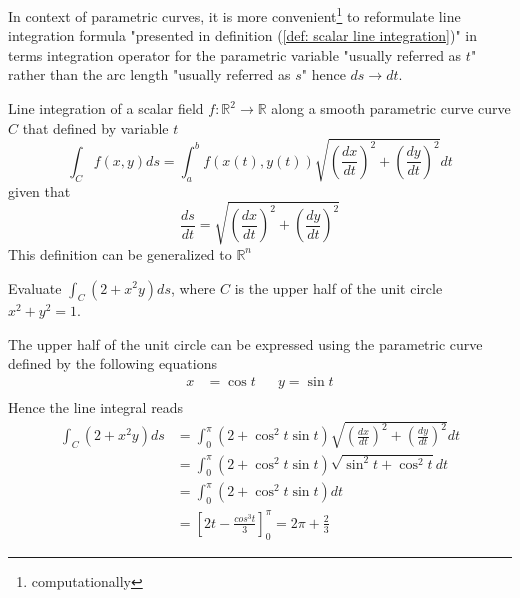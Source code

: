 \documentclass[../../main.tex]{subfiles}
\begin{document}
	\par In context of parametric curves, it is more convenient\footnote{computationally} to reformulate line integration formula  "presented in definition (\ref{def: scalar line integration})" in terms integration operator for the parametric variable "usually referred as $t$" rather than the arc length "usually referred as $s$" hence $ds \rightarrow dt$.
	
	\begin{definition}
		Line integration of a scalar field $f: \mathbb{R}^2 \rightarrow \mathbb{R}$ along a smooth parametric curve curve $C$ that defined by variable $t$
		\begin{equation*}
			\int_C f(x,y) ds = \int_a^b f(x(t), y(t)) \sqrt{\left( \frac{dx}{dt} \right)^2 + \left( \frac{dy}{dt} \right)^2} dt
		\end{equation*}
		given that
		\begin{equation*}
			\frac{ds}{dt} = \sqrt{\left( \frac{dx}{dt} \right)^2 + \left( \frac{dy}{dt} \right)^2}
		\end{equation*}
		This definition can be generalized to $\mathbb{R}^n$
	\end{definition}


	\begin{example}
		Evaluate $\int_C (2+x^2y) ds$, where $C$ is the upper half of the unit circle $x^2 + y^2 = 1$.
	\end{example}
	\begin{solution}
		The upper half of the unit circle can be expressed using the parametric curve defined by the following equations
		\begin{align*}
			x &= \cos t		&&y = \sin t\\
		\end{align*}
		Hence the line integral reads
		\begin{align*}
			\int_C (2+x^2y) ds 	&= \int_0^\pi (2 + \cos^2t \sin t) \sqrt{\left( \frac{dx}{dt} \right)^2 + \left( \frac{dy}{dt} \right)^2} dt \\
								&= \int_0^\pi (2 + \cos^2t \sin t) \sqrt{\sin^2 t + \cos^2 t} dt \\
								&= \int_0^\pi (2 + \cos^2t \sin t) dt\\
								&= \left\lbrack 2t - \frac{cos^3 t}{3}  \right\rbrack_0^\pi = 2\pi + \frac{2}{3}
		\end{align*}
	\end{solution}
		
\end{document}
